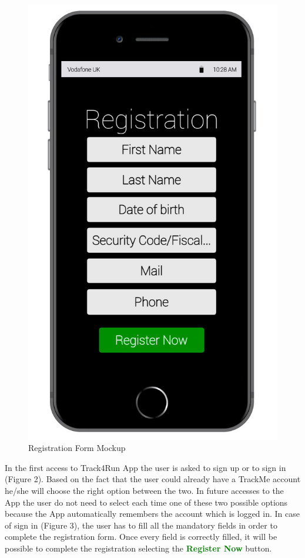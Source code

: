 \begin{enumerate}
\begin{figure}[H]
\begin{center}
\begin{minipage}[c]{.40\textwidth}
          \includegraphics[height=14 cm]{Images/Mockups/Track4RunMockup4.jpg}
	\caption{Registration Form Mockup}
        \end{minipage}
      \end{center}
\end{figure}
In the first access to Track4Run App the user is asked to sign up or to sign in 			(Figure 2). Based on the fact that the user could already have a TrackMe account he/she will choose the right option between the two. In future accesses to the App the user do not need to select each time one of these two possible options because the App automatically remembers the account which is logged in. In case of sign in (Figure 3), the user has to fill all the mandatory fields in order to complete the registration form. Once every field is correctly filled, it will be possible to complete the registration selecting the {\textcolor{Green}{\textbf{Register Now}}} button. 
\clearpage
\begin{figure}[H]
\begin{center}
        \begin{minipage}[c]{.40\textwidth}
        \centering

\end{minipage}
\end{center}
\end{figure}
\end{enumerate}
